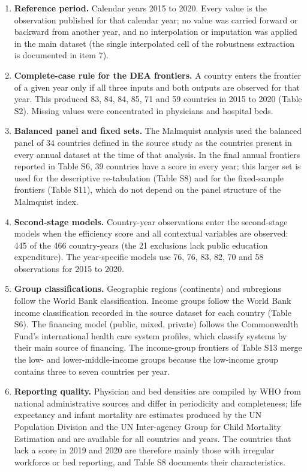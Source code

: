 \documentclass[11pt,letterpaper]{article}
\begin{document}
\begin{enumerate}
\item \textbf{Reference period.} Calendar years 2015 to 2020. Every value is the observation published for that calendar year; no value was carried forward or backward from another year, and no interpolation or imputation was applied in the main dataset (the single interpolated cell of the robustness extraction is documented in item 7).
\item \textbf{Complete-case rule for the DEA frontiers.} A country enters the frontier of a given year only if all three inputs and both outputs are observed for that year. This produced 83, 84, 84, 85, 71 and 59 countries in 2015 to 2020 (Table S2). Missing values were concentrated in physicians and hospital beds.
\item \textbf{Balanced panel and fixed sets.} The Malmquist analysis used the balanced panel of 34 countries defined in the source study as the countries present in every annual dataset at the time of that analysis.\citep{valenzuela2024} In the final annual frontiers reported in Table S6, 39 countries have a score in every year; this larger set is used for the descriptive re-tabulation (Table S8) and for the fixed-sample frontiers (Table S11), which do not depend on the panel structure of the Malmquist index.
\item \textbf{Second-stage models.} Country-year observations enter the second-stage models when the efficiency score and all contextual variables are observed: 445 of the 466 country-years (the 21 exclusions lack public education expenditure). The year-specific models use 76, 76, 83, 82, 70 and 58 observations for 2015 to 2020.
\item \textbf{Group classifications.} Geographic regions (continents) and subregions follow the World Bank classification. Income groups follow the World Bank income classification recorded in the source dataset for each country (Table S6). The financing model (public, mixed, private) follows the Commonwealth Fund's international health care system profiles, which classify systems by their main source of financing.\citep{commonwealth2024} The income-group frontiers of Table S13 merge the low- and lower-middle-income groups because the low-income group contains three to seven countries per year.
\item \textbf{Reporting quality.} Physician and bed densities are compiled by WHO from national administrative sources and differ in periodicity and completeness; life expectancy and infant mortality are estimates produced by the UN Population Division and the UN Inter-agency Group for Child Mortality Estimation and are available for all countries and years. The countries that lack a score in 2019 and 2020 are therefore mainly those with irregular workforce or bed reporting, and Table S8 documents their characteristics.

\end{enumerate}
\end{document}
